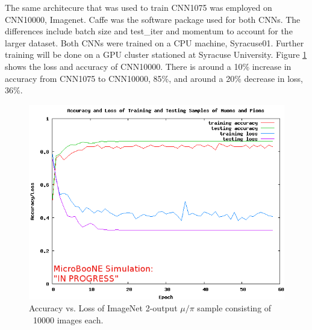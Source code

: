 The same architecure that was used to train CNN1075 was employed on CNN10000, Imagenet. Caffe \cite{caffe} was the software package used for both CNNs. The differences include batch size and test{\_}iter and momentum to account for the larger dataset. Both CNNs were trained on a CPU machine, Syracuse01. Further training will be done on a GPU cluster stationed at Syracuse University. Figure \ref{fig:loss_accuracy} shows the loss and accuracy of CNN10000. There is around a 10\% increase in accuracy from CNN1075 to CNN10000, 85\%, and around a 20\% decrease in loss, 36\%.      

\begin{figure}[htp!]
\centering
\includegraphics[scale=.55]{figs/acc_loss_10000_062117.png}
\caption{Accuracy vs. Loss of ImageNet 2-output $\mu/\pi$ sample consisting of ~10000 images each.} 
\label{fig:loss_accuracy}
\end{figure}

